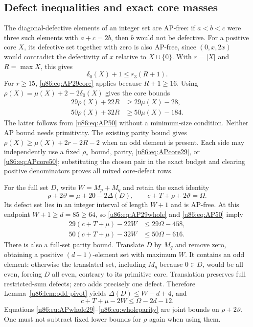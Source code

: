 \documentclass[11pt,a4paper]{article}
\theoremstyle{remark}
\begin{document}
\subsection{Defect inequalities and exact core masses}\label{u86:sec:APdefects}
The diagonal-defective elements of an integer set are AP-free: if
$a<b<c$ were three such elements with $a+c=2b$, then $b$ would not be
defective. For a positive core $X$, its defective set together with
zero is also AP-free, since $(0,x,2x)$ would contradict the defectivity
of $x$ relative to $X\cup\{0\}$. With $r=|X|$ and $R=\max X$, this gives
\[
 \delta_0(X)+1\le r_3(R+1).
\]
For $r\ge15$, \eqref{u86:eq:AP29core} applies because $R+1\ge16$.
Using $\rho(X)=\mu(X)+2-2\delta_0(X)$ gives the core bounds
\begin{align}
 29\rho(X)+22R&\ge29\mu(X)-28,\label{u86:eq:APcore29}\\
 50\rho(X)+32R&\ge50\mu(X)-184.\label{u86:eq:APcore50}
\end{align}
The latter follows from \eqref{u86:eq:AP50} without a minimum-size condition.
Neither AP bound needs primitivity. The existing parity bound gives
$\rho(X)\ge\mu(X)+2r-2R-2$ when an odd element is present.
Each side may independently use a fixed $\rho_*$ bound, parity,
\eqref{u86:eq:APcore29}, or \eqref{u86:eq:APcore50}; substituting the chosen
pair in the exact budget and clearing positive denominators proves
all mixed core-defect rows.

For the full set $D$, write $W=M_p+M_q$ and retain the exact identity
\begin{equation}\label{u86:eq:jointtheta}
 \rho+2\vartheta=\mu+20-2\Delta(D),\qquad
 c+T+\rho+2\vartheta=\Omega.
\end{equation}
Its defect set lies in an integer interval of length $W+1$ and is
AP-free. At this endpoint $W+1\ge d=85\ge64$, so
\eqref{u86:eq:AP29whole} and \eqref{u86:eq:AP50} imply
\begin{align}
 29(c+T+\mu)-22W&\le29\Omega-458,\label{u86:eq:APwhole29}\\
 50(c+T+\mu)-32W&\le50\Omega-616.\label{u86:eq:APwhole50}
\end{align}
There is also a full-set parity bound. Translate $D$ by $M_q$ and
remove zero, obtaining a positive $(d-1)$-element set with maximum
$W$. It contains an odd element: otherwise the translated set,
including $M_q$ because $0\in D$, would be all even, forcing $D$ all
even, contrary to its primitive core. Translation preserves full
restricted-sum defects; zero adds precisely one defect. Therefore
Lemma~\ref{u86:lem:odd-pivot} yields $\Delta(D)\le W-d+4$, and
\begin{equation}\label{u86:eq:wholeparity}
 c+T+\mu-2W\le\Omega-2d-12.
\end{equation}
Equations \eqref{u86:eq:APwhole29}--\eqref{u86:eq:wholeparity} are joint bounds
on $\rho+2\vartheta$. One must not subtract fixed lower bounds for
$\rho$ again when using them.
\end{document}
